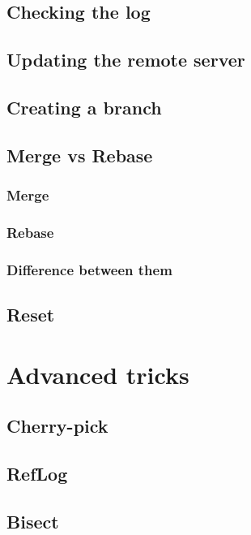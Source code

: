 \documentclass{article}
\begin{document}
\subsection{Checking the log}

\subsection{Updating the remote server}

\subsection{Creating a branch}

\subsection{Merge vs Rebase}

\subsubsection{Merge}

\subsubsection{Rebase}

\subsubsection{Difference between them}

\subsection{Reset}

\section{Advanced tricks}

\subsection{Cherry-pick}

\subsection{RefLog}

\subsection{Bisect}

\subsection{}
\end{document}
